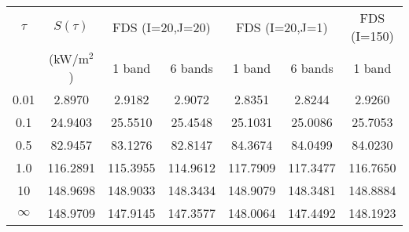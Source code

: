 \begin{center}
\begin{tabular}{|c|c|c|c|c|c|c|} \hline
$\tau$ & $S(\tau)$ & \multicolumn{2}{|c|}{FDS (I=20,J=20)} &
\multicolumn{2}{|c|}{FDS (I=20,J=1)} & FDS (I=150) \\ \cline{3-7}
 & (kW/m$^2$) & 1 band & 6 bands & 1 band & 6 bands & 1 band \\ \hline\hline
0.01 &    2.8970 &    2.9182 &    2.9072 &    2.8351 &    2.8244 &    2.9260 \\
0.1 &   24.9403 &   25.5510 &   25.4548 &   25.1031 &   25.0086 &   25.7053 \\
0.5 &   82.9457 &   83.1276 &   82.8147 &   84.3674 &   84.0499 &   84.0230 \\
1.0 &  116.2891 &  115.3955 &  114.9612 &  117.7909 &  117.3477 &  116.7650 \\
10 &  148.9698 &  148.9033 &  148.3434 &  148.9079 &  148.3481 &  148.8884 \\
$\infty$ &  148.9709 &  147.9145 &  147.3577 &  148.0064 &  147.4492 &  148.1923 \\
\hline
\end{tabular}
\end{center}
